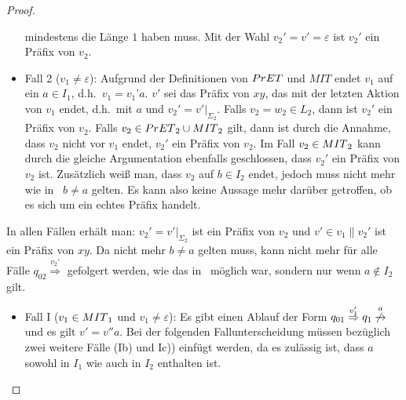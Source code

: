 \begin{proof}
\begin{itemize}
      mindestens die Länge $1$ haben muss. Mit der Wahl
      $v_2'=v'=\varepsilon$ ist $v_2'$ ein Präfix von $v_2$.
    \item Fall 2 ($v_1\neq\varepsilon$): Aufgrund der Definitionen von $PrET{}$
      und $MIT$ endet $v_1$ auf ein $a\in I_1$, d.h.\ $v_1=v_1’a$. $v'$ sei das
      Präfix von $xy$, das mit der letzten Aktion von $v_1$ endet, d.h.\ mit
      $a$ und $v_2'=v'|_{\Sigma _{2}}$. Falls $v_2 = w_2\in L_2$, dann ist
      $v_2'$ ein Präfix von $v_2$. Falls $v_2\in
      PrET{}_2\cup MIT{}_2$ gilt, dann ist durch die Annahme, dass $v_2$ nicht vor
      $v_1$ endet, $v_2'$ ein Präfix von $v_2$. Im Fall $v_2\in MIT{}_2$ kann
      durch die gleiche Argumentation ebenfalls geschlossen, dass $v_2'$ ein
      Präfix von $v_2$ ist. Zusätzlich weiß man, dass $v_2$ auf $b\in
      I_2$ endet, jedoch muss nicht mehr wie in~\cite{Vogler2014EIO} $b\neq a$
      gelten. Es kann also keine Aussage mehr darüber getroffen, ob es sich um
      ein echtes Präfix handelt.
  \end{itemize}
  In allen Fällen erhält man: $v_2'=v'|_{\Sigma _2}$ ist ein Präfix von $v_2$
  und $v'\in v_1\| v_2'$ ist ein Präfix von $xy$. Da nicht mehr $b\neq a$
  gelten muss, kann nicht mehr für alle Fälle $q_{02}
  \overset{v_2'}{\Rightarrow}$ gefolgert werden, wie das
  in~\cite{Vogler2014EIO} möglich war, sondern nur wenn $a\notin I_2$ gilt.
  \begin{itemize}
    \item Fall I ($v_1\in MIT{}_1$ und $v_1\neq\varepsilon$): Es gibt einen
      Ablauf der Form $q_{01} \overset{v_1'}{\Rightarrow}q_1
      \overset{a}{\not{\hspace{-0.1cm}\rightarrow}}$ und es gilt $v'=v''a$. Bei der
      folgenden Fallunterscheidung müssen bezüglich~\cite{Vogler2014EIO}
      zwei weitere Fälle (Ib) und Ic)) einfügt werden, da es zulässig ist, dass $a$
      sowohl in $I_1$ wie auch in $I_2$ enthalten ist.
\end{itemize}
\end{proof}
